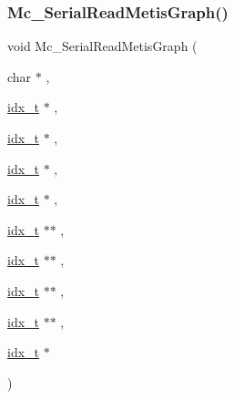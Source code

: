 \subsubsection{\texorpdfstring{Mc\+\_\+\+Serial\+Read\+Metis\+Graph()}{Mc\_SerialReadMetisGraph()}}
{\footnotesize\ttfamily void Mc\+\_\+\+Serial\+Read\+Metis\+Graph (\begin{DoxyParamCaption}\item[{char $\ast$}]{,  }\item[{\hyperlink{a00876_aaa5262be3e700770163401acb0150f52}{idx\+\_\+t} $\ast$}]{,  }\item[{\hyperlink{a00876_aaa5262be3e700770163401acb0150f52}{idx\+\_\+t} $\ast$}]{,  }\item[{\hyperlink{a00876_aaa5262be3e700770163401acb0150f52}{idx\+\_\+t} $\ast$}]{,  }\item[{\hyperlink{a00876_aaa5262be3e700770163401acb0150f52}{idx\+\_\+t} $\ast$}]{,  }\item[{\hyperlink{a00876_aaa5262be3e700770163401acb0150f52}{idx\+\_\+t} $\ast$$\ast$}]{,  }\item[{\hyperlink{a00876_aaa5262be3e700770163401acb0150f52}{idx\+\_\+t} $\ast$$\ast$}]{,  }\item[{\hyperlink{a00876_aaa5262be3e700770163401acb0150f52}{idx\+\_\+t} $\ast$$\ast$}]{,  }\item[{\hyperlink{a00876_aaa5262be3e700770163401acb0150f52}{idx\+\_\+t} $\ast$$\ast$}]{,  }\item[{\hyperlink{a00876_aaa5262be3e700770163401acb0150f52}{idx\+\_\+t} $\ast$}]{ }\end{DoxyParamCaption})}

